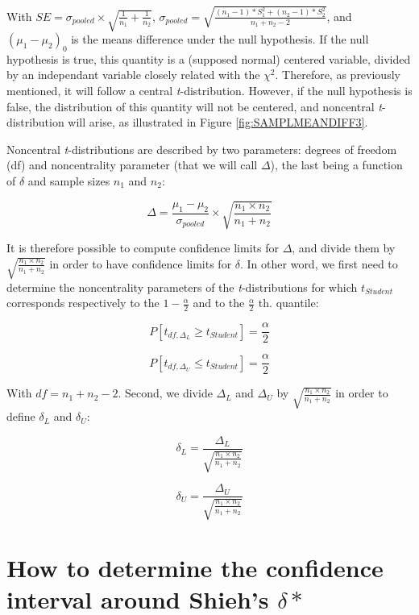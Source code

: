 \documentclass[man,floatsintext]{apa6}
\begin{document}
With \(SE = \sigma_{pooled} \times \sqrt{\frac{1}{n_1}+\frac{1}{n_2}}\), \(\sigma_{pooled} = \sqrt{\frac{(n_1-1)*S^2_1+(n_2-1)*S^2_2}{n_1+n_2-2}}\), and \((\mu_1-\mu_2)_0\) is the means difference under the null hypothesis. If the null hypothesis is true, this quantity is a (supposed normal) centered variable, divided by an independant variable closely related with the \(\chi^2\). Therefore, as previously mentioned, it will follow a central \emph{t}-distribution. However, if the null hypothesis is false, the distribution of this quantity will not be centered, and noncentral \emph{t}-distribution will arise, as illustrated in Figure \ref{fig:SAMPLMEANDIFF3}.

Noncentral \emph{t}-distributions are described by two parameters: degrees of freedom (df) and noncentrality parameter (that we will call \(\Delta\)), the last being a function of \(\delta\) and sample sizes \(n_1\) and \(n_2\):

\begin{equation}
\Delta = \frac{\mu_1-\mu_2}{\sigma_{pooled}} \times \sqrt{\frac{n_1 \times n_2}{n_1 + n_2}}
\label{eq:ncp}
\end{equation}

It is therefore possible to compute confidence limits for \(\Delta\), and divide them by \(\sqrt{\frac{n_1 \times n_2}{n_1 + n_2}}\) in order to have confidence limits for \(\delta\). In other word, we first need to determine the noncentrality parameters of the \emph{t}-distributions for which \(t_{Student}\) corresponds respectively to the \(1-\frac{\alpha}{2}\) and to the \(\frac{\alpha}{2}\) th. quantile:

\[P[t_{df, \Delta_L} \geq t_{Student}] = \frac{\alpha}{2} \]

\[P[t_{df, \Delta_U} \leq t_{Student}] = \frac{\alpha}{2} \]

With \(df = n_1+n_2-2\). Second, we divide \(\Delta_L\) and \(\Delta_U\) by \(\sqrt{\frac{n_1 \times n_2}{n_1 + n_2}}\) in order to define \(\delta_L\) and \(\delta_U\):

\[\delta_L = \frac{\Delta_L}{\sqrt{\frac{n_1 \times n_2}{n_1 + n_2}}}\]

\[\delta_U = \frac{\Delta_U}{\sqrt{\frac{n_1 \times n_2}{n_1 + n_2}}}\]

\hypertarget{how-to-determine-the-confidence-interval-around-shiehs-delta}{%
\section{\texorpdfstring{How to determine the confidence interval around Shieh's \(\delta*\)}{How to determine the confidence interval around Shieh's \textbackslash delta*}}\label{how-to-determine-the-confidence-interval-around-shiehs-delta}}
\end{document}
